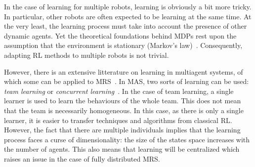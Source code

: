   In the case of learning for multiple robots, learning is obviously a bit more tricky. In particular, other robots are often expected to be learning at the same time. At the very least, the learning process must take into account the presence of other dynamic agents. Yet the theoretical foundations behind MDPs rest upon the assumption that the environment is stationary (Markov's law)~\parencite{Littman1994, Parker2008}. Consequently, adapting RL methods to multiple robots is not trivial.

  However, there is an extensive litterature on learning in multiagent systems, of which some can be applied to MRS~\parencite{Stone2000, Yang2005, Panait2005}. In MAS, two sorts of learning can be used: \emph{team learning} or \emph{concurrent learning}~\parencite{Panait2005}. In the case of team learning, a single learner is used to learn the behaviours of the whole team. This does not mean that the team is necessarily homogeneous. In this case, as there is only a single learner, it is easier to transfer techniques and algorithms from classical RL. However, the fact that there are multiple individuals implies that the learning process faces a curse of dimensionality: the size of the states space increases with the number of agents. This also means that learning will be centralized which raises an issue in the case of fully distributed MRS. 

